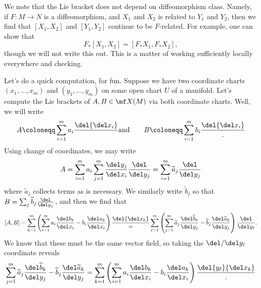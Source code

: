 \documentclass[../notes.tex]{subfiles}
\begin{document}
\begin{remark}
	We note that the Lie bracket does not depend on diffeomorphism class. Namely, if $F\colon M\to N$ is a diffeomorphism, and $X_1$ and $X_2$ is related to $Y_1$ and $Y_2$, then we find that $[X_1,X_2]$ and $[Y_1,Y_2]$ continue to be $F$-related. For example, one can show that
	\[F_*[X_1,X_2]=[F_*X_1,F_*X_2],\]
	though we will not write this out. This is a matter of working sufficiently locally everywhere and checking.
\end{remark}
Let's do a quick computation, for fun. Suppose we have two coordinate charts $(x_1,\ldots,x_m)$ and $(y_1,\ldots,y_m)$ on some open chart $U$ of a manifold. Let's compute the Lie brackets of $A,B\in\mf X(M)$ via both coordinate charts. Well, we will write
\[A\coloneqq\sum_{i=1}^ma_i\frac\del{\del x_i}\qquad\text{and}\qquad B\coloneqq\sum_{i=1}^mb_i\frac\del{\del x_i}.\]
Using change of coordinates, we may write
\[A=\sum_{i=1}^ma_i\sum_{j=1}^m\frac{\del y_j}{\del x_i}\frac{\del}{\del y_j}=\sum_{i=1}^m\widetilde a_j\frac{\del}{\del y_j}\]
where $\widetilde a_j$ collects terms as is necessary. We similarly write $\widetilde b_j$ so that $B=\sum_j\widetilde b_j\frac{\del}{\del y_j}$, and then we find that
\[[A,B]=\sum_{k=1}^m\left(\sum_{i=1}^ma_i\frac{\del b_k}{\del x_i}-b_i\frac{\del a_k}{\del x_i}\right)\frac\del{\del x_k}=\sum_{\ell=1}^m\left(\sum_{j=1}^m\widetilde a_j\frac{\del\widetilde b_k}{\del y_j}-\widetilde b_j\frac{\del\widetilde a_k}{\del y_j}\right)\frac{\del}{\del y_\ell}.\]
We know that these must be the same vector field, so taking the $\del/\del y_\ell$ coordinate reveals
\[\sum_{j=1}^m\widetilde a_j\frac{\del\widetilde b_k}{\del y_j}-\widetilde b_j\frac{\del\widetilde a_k}{\del y_j}=\sum_{k=1}^m\left(\sum_{i=1}^ma_i\frac{\del b_k}{\del x_i}-b_i\frac{\del a_k}{\del x_i}\right)\frac\del{y_\ell}{\del x_k}.\]
\end{document}
